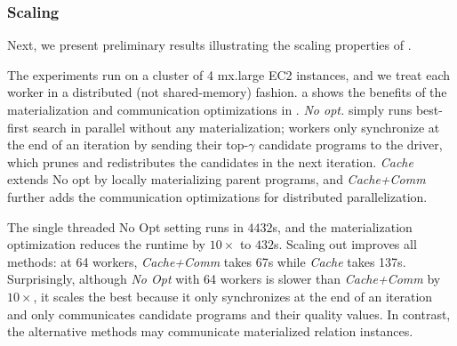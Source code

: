 

\subsubsection{Scaling}
Next, we present preliminary results illustrating the scaling properties of \sys. 

\vspace{1em}

 The experiments run on a cluster of 4 mx.large EC2 instances, and we treat each worker in a distributed (not shared-memory) fashion.   a shows the benefits of the materialization and communication optimizations in .  {\it No opt.} simply runs best-first search in parallel without any materialization; workers only synchronize at the end of an iteration by sending their top-$\gamma$ candidate programs to the driver, which prunes and redistributes the candidates in the next iteration.  {\it Cache} extends No opt by locally materializing parent programs, and {\it Cache+Comm} further adds the communication optimizations for distributed parallelization.   

The single threaded No Opt setting runs in $4432$s, and the materialization optimization reduces the runtime by $10\times$ to $432$s.   Scaling out improves all methods: at 64 workers, {\it Cache+Comm} takes 67s while {\it Cache} takes 137s.  Surprisingly, although {\it No Opt} with 64 workers is slower than {\it Cache+Comm} by $10\times$, it scales the best because it only synchronizes at the end of an iteration and only communicates candidate programs and their quality values.  In contrast, the alternative methods may communicate materialized relation instances.  

